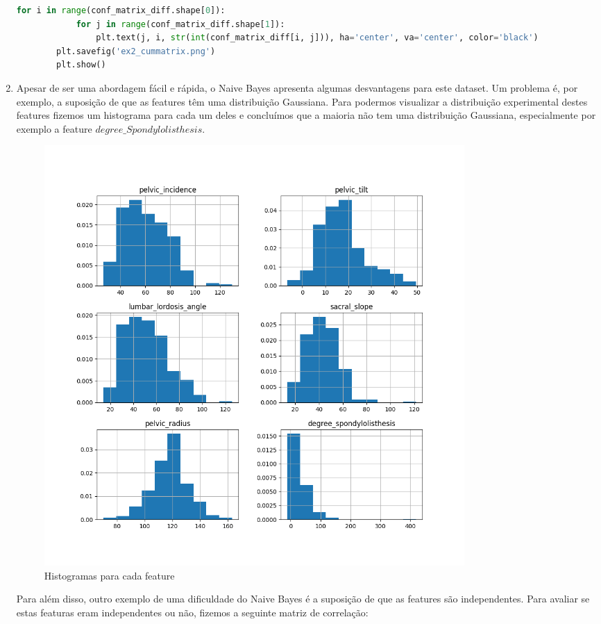 \documentclass[a4paper,12pt]{article} %
\begin{document}
\begin{enumerate}
\begin{lstlisting}[language=Python]
        for i in range(conf_matrix_diff.shape[0]):
            for j in range(conf_matrix_diff.shape[1]):
                plt.text(j, i, str(int(conf_matrix_diff[i, j])), ha='center', va='center', color='black')
        plt.savefig('ex2_cummatrix.png')
        plt.show()
    \end{lstlisting}
    
\item Apesar de ser uma abordagem fácil e rápida, o Naive Bayes apresenta algumas desvantagens para este dataset. 
Um problema é, por exemplo, a suposição de que as features têm uma distribuição Gaussiana. Para podermos visualizar a distribuição
experimental destes features fizemos um histograma para cada um deles e concluímos que a maioria não tem uma distribuição Gaussiana, especialmente por exemplo a feature $degree\_Spondylolisthesis$.

\begin{figure}[H]
    \centering
    \includegraphics[width=0.8\textwidth]{ex3_1_hist.png}
    \caption{Histogramas para cada feature}
    \label{fig:ex3_histograms}
\end{figure}

Para além disso, outro exemplo de uma dificuldade do Naive Bayes é a suposição de que as features são independentes. Para avaliar 
se estas featuras eram independentes ou não, fizemos a seguinte matriz de correlação:


\end{enumerate}
\end{document}
